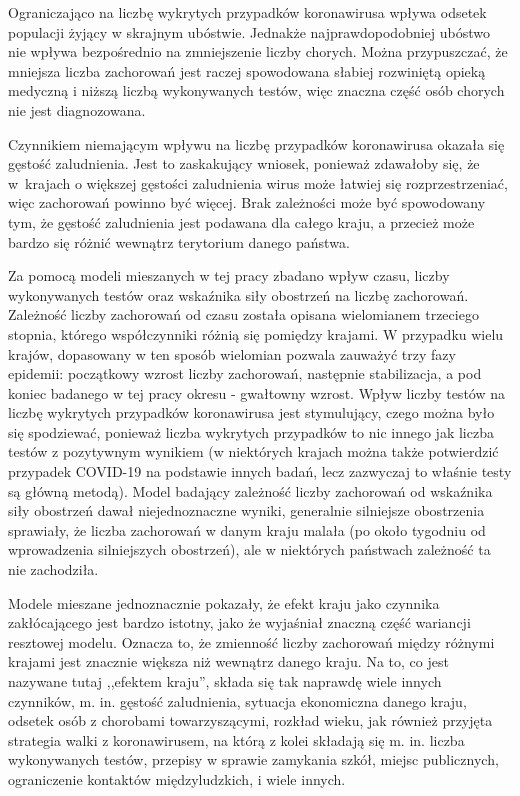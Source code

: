 \documentclass[12pt]{mwbk}
\theoremstyle{plain}
\theoremstyle{definition}
\theoremstyle{definition}
\begin{document}
Ograniczająco na liczbę wykrytych przypadków koronawirusa wpływa odsetek populacji żyjący w skrajnym ubóstwie. Jednakże najprawdopodobniej ubóstwo nie wpływa bezpośrednio na zmniejszenie liczby chorych. Można przypuszczać, że mniejsza liczba zachorowań jest raczej spowodowana słabiej rozwiniętą opieką medyczną i niższą liczbą wykonywanych testów, więc znaczna część osób chorych nie jest diagnozowana.

Czynnikiem niemającym wpływu na liczbę przypadków koronawirusa okazała się gęstość zaludnienia. Jest to zaskakujący wniosek, ponieważ zdawałoby się, że w~krajach o większej gęstości zaludnienia wirus może łatwiej się rozprzestrzeniać, więc zachorowań powinno być więcej. Brak zależności może być spowodowany tym, że gęstość zaludnienia jest podawana dla całego kraju, a przecież może bardzo się różnić wewnątrz terytorium danego państwa.

Za pomocą modeli mieszanych w tej pracy zbadano wpływ czasu, liczby wykonywanych testów oraz wskaźnika siły obostrzeń na liczbę zachorowań. Zależność liczby zachorowań od czasu została opisana wielomianem trzeciego stopnia, którego współczynniki różnią się pomiędzy krajami. W przypadku wielu krajów, dopasowany w ten sposób wielomian pozwala zauważyć trzy fazy epidemii: początkowy wzrost liczby zachorowań, następnie stabilizacja, a pod koniec badanego w tej pracy okresu - gwałtowny wzrost. Wpływ liczby testów na liczbę wykrytych przypadków koronawirusa jest stymulujący, czego można było się spodziewać, ponieważ liczba wykrytych przypadków to nic innego jak liczba testów z pozytywnym wynikiem (w niektórych krajach można także potwierdzić przypadek COVID-19 na podstawie innych badań, lecz zazwyczaj to właśnie testy są główną metodą). Model badający zależność liczby zachorowań od wskaźnika siły obostrzeń dawał niejednoznaczne wyniki, generalnie silniejsze obostrzenia sprawiały, że liczba zachorowań w danym kraju malała (po około tygodniu od wprowadzenia silniejszych obostrzeń), ale w niektórych państwach zależność ta nie zachodziła.

Modele mieszane jednoznacznie pokazały, że efekt kraju jako czynnika zakłócającego jest bardzo istotny, jako że wyjaśniał znaczną część wariancji resztowej modelu. Oznacza to, że zmienność liczby zachorowań między różnymi krajami jest znacznie większa niż wewnątrz danego kraju. Na to, co jest nazywane tutaj ,,efektem kraju'', składa się tak naprawdę wiele innych czynników, m. in. gęstość zaludnienia, sytuacja ekonomiczna danego kraju, odsetek osób z chorobami towarzyszącymi, rozkład wieku, jak również przyjęta strategia walki z koronawirusem, na którą z kolei składają się m. in. liczba wykonywanych testów, przepisy w sprawie zamykania szkół, miejsc publicznych, ograniczenie kontaktów międzyludzkich, i wiele innych.
\end{document}
